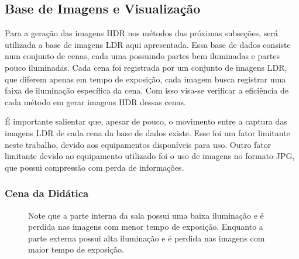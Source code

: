 \subsection{Base de Imagens e Visualização} \label{metodoBaseImg}

Para a geração das imagens HDR nos métodos das próximas subseções, será utilizada a base de imagens LDR aqui apresentada. Essa base de dados consiste num conjunto de cenas, cada uma possuindo partes bem iluminadas e partes pouco iluminadas. Cada cena foi registrada por um conjunto de imagens LDR, que diferem apenas em tempo de exposição, cada imagem busca registrar uma faixa de iluminação específica da cena. Com isso visa-se verificar a eficiência de cada método em gerar imagens HDR dessas cenas.

É importante salientar que, apesar de pouco, o movimento entre a captura das imagens LDR de cada cena da base de dados existe. Esse foi um fator limitante neste trabalho, devido aos equipamentos disponíveis para uso. Outro fator limitante devido ao equipamento utilizado foi o uso de imagens no formato JPG, que possui compressão com perda de informações.

\subsubsection{Cena da Didática} \label{cenaDidatica}

\begin{figure}[H]
  \quad %
  \quad %
  \quad %
  \quad %
  \caption{Note que a parte interna da sala possui uma baixa iluminação e é perdida nas imagens com menor tempo de exposição. Enquanto a parte externa possui alta iluminação e é perdida nas imagens com maior tempo de exposição.}
  \label{figBaseDidaticas}
\end{figure}

